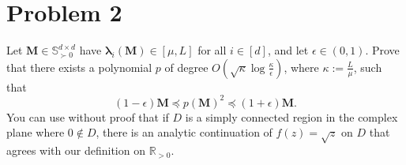 \section*{Problem 2}

Let $\mathbf{M} \in \mathbb{S}_{\succ 0}^{d \times d}$ have $\boldsymbol{\lambda}_i(\mathbf{M}) \in [\mu, L]$ for all $i \in [d]$, and let $\epsilon \in (0, 1)$. Prove that there exists a polynomial $p$ of degree $O(\sqrt{\kappa} \log \frac{\kappa}{\epsilon})$, where $\kappa := \frac{L}{\mu}$, such that
\[
(1 - \epsilon)\mathbf{M} \preceq p(\mathbf{M})^2 \preceq (1 + \epsilon)\mathbf{M}.
\]
You can use without proof that if $D$ is a simply connected region in the complex plane where $0 \notin D$, there is an analytic continuation of $f(z) = \sqrt{z}$ on $D$ that agrees with our definition on $\mathbb{R}_{>0}$.
